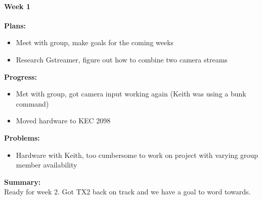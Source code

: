 \paragraph{Week 1}
\begin{adjustwidth}{2.5em}{0pt}
    \vspace{-0.5cm}\textbf{Plans:}
    \vspace{-0.5cm}
    \begin{itemize}
        \item Meet with group, make goals for the coming weeks
        \item Research Gstreamer, figure out how to combine two camera streams
    \end{itemize} 
    \vspace{-0.3cm}\textbf{Progress:}
    \vspace{-0.5cm}
    \begin{itemize}
        \item Met with group, got camera input working again (Keith was using a bunk command)
        \item Moved hardware to KEC 2098
    \end{itemize} 
    \vspace{-0.3cm}\textbf{Problems:}
    \vspace{-0.5cm}
    \begin{itemize}
        \item Hardware with Keith, too cumbersome to work on project with varying group member availability
    \end{itemize}  
    \vspace{-0.3cm}\noindent\textbf{Summary:}\\
    \noindent
    Ready for week 2. Got TX2 back on track and we have a goal to word towards.
\end{adjustwidth} 

